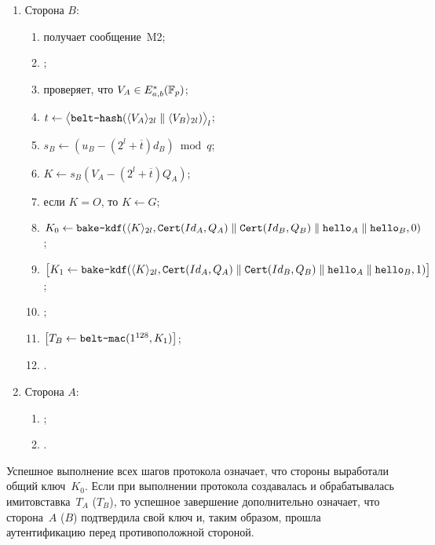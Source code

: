 \begin{enumerate}
\item
Сторона $B$:
\begin{enumerate}
\item
получает сообщение~M2;
\item
{};
\item
проверяет, что $V_A\in E_{a,b}^*(\mathbb{F}_p)$;
\item
$t\leftarrow\bigl\langle
\texttt{belt-hash}
(\langle V_A\rangle_{2l}\parallel\langle V_B\rangle_{2l})
\bigr\rangle_{l}$;
\item
$s_B\leftarrow (u_B-(2^l+\overline{t})d_B)\bmod q$;
\item
$K\leftarrow s_B(V_A-(2^l+\overline{t})Q_A)$;
\item
если $K=O$, то $K\leftarrow G$;
\item
$K_0\leftarrow\texttt{bake-kdf}
(\langle K\rangle_{2l},
\texttt{Cert}(Id_A,Q_A)\parallel \texttt{Cert}(Id_B,Q_B)\parallel 
\texttt{hello}_A\parallel\texttt{hello}_B,
0)$;
\item
$\mathbf{\bigl[}
K_1\leftarrow\texttt{bake-kdf}
(\langle K\rangle_{2l},
\texttt{Cert}(Id_A,Q_A)\parallel \texttt{Cert}(Id_B,Q_B)\parallel 
\texttt{hello}_A\parallel\texttt{hello}_B,
1)\mathbf{\bigr]}$;
\item
{};
\item
$\mathbf{\bigl[}T_B\leftarrow\texttt{belt-mac}(1^{128},K_1)\mathbf{\bigr]}$;
\item
{}.
\end{enumerate}

\item
Сторона $A$:
\begin{enumerate}
\item
{};
\item
{}.
\end{enumerate}
\end{enumerate}

Успешное выполнение всех шагов протокола означает, что 
стороны выработали общий ключ~$K_0$.
%
Если при выполнении протокола  
создавалась и обрабатывалась имитовставка~$T_A$ ($T_B$),
то успешное завершение дополнительно означает,
что сторона~$A$ ($B$) подтвердила свой ключ и, таким образом, 
прошла аутентификацию перед противоположной стороной.

